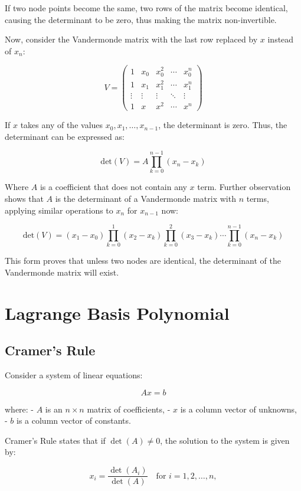 \documentclass[12pt]{report} %
\begin{document}
If two node points become the same, two rows of the matrix become identical, causing the determinant to be zero, thus making the matrix non-invertible.

Now, consider the Vandermonde matrix with the last row replaced by \( x \) instead of \( x_n \):

\[
V =
\begin{pmatrix}
1 & x_0 & x_0^2 & \cdots & x_0^n \\
1 & x_1 & x_1^2 & \cdots & x_1^n \\
\vdots & \vdots & \vdots & \ddots & \vdots \\
1 & x & x^2 & \cdots & x^n
\end{pmatrix}
\]

If \( x \) takes any of the values \( x_0, x_1, \ldots, x_{n-1} \), the determinant is zero. Thus, the determinant can be expressed as:

\[
\text{det}(V) = A \prod_{k=0}^{n-1} (x_n - x_k)
\]

Where \( A \) is a coefficient that does not contain any \( x \) term. Further observation shows that \( A \) is the determinant of a Vandermonde matrix with \( n \) terms, applying similar operations to \( x_n \) for \( x_{n-1} \) now:

\[
\text{det}(V) = (x_1 - x_0) \prod_{k=0}^{1} (x_2 - x_k) \prod_{k=0}^{2} (x_3 - x_k) \cdots \prod_{k=0}^{n-1} (x_n - x_k)
\]

This form proves that unless two nodes are identical, the determinant of the Vandermonde matrix will exist.

\section{Lagrange Basis Polynomial}

\subsection{Cramer’s Rule}
Consider a system of linear equations:

\[
Ax = b
\]

where:
- \( A \) is an \( n \times n \) matrix of coefficients,
- \( x \) is a column vector of unknowns,
- \( b \) is a column vector of constants.

Cramer’s Rule states that if \( \det(A) \neq 0 \), the solution to the system is given by:

\[
x_i = \frac{\det(A_i)}{\det(A)} \quad \text{for } i = 1, 2, \ldots, n,
\]
\end{document}
